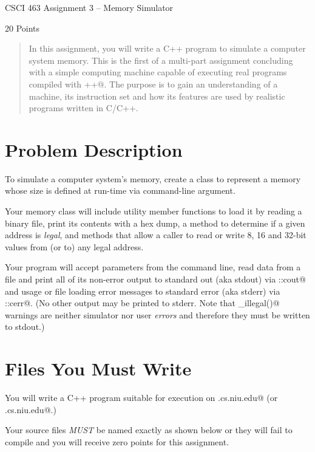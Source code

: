 \documentclass[11pt]{article}
\newcommand\MyTitle{CSCI 463 Assignment 3 -- Memory Simulator}
\begin{document}
 
\thispagestyle{plain}
\centerline{\huge\MyTitle}
\vspace{.2in}
\centerline{20 Points}

\begin{abstract}
\noindent In this assignment, you will write a C++ program to simulate 
a computer system memory.
This is the first of a multi-part assignment concluding with a simple
computing machine capable of executing real programs compiled with \verb@g++@.
The purpose is to gain an understanding of a machine, its instruction 
set and how its features are used by realistic programs written in C/C++.
\end{abstract}

\section{Problem Description}

To simulate a computer system's memory, create a class to represent a memory
whose size is defined at run-time via command-line argument.

Your memory class will include utility member functions to load it by reading 
a binary file, print its contents with a hex dump, a method to determine
if a given address is {\em legal}, and methods that allow a caller
to read or write 8, 16 and 32-bit values from (or to) any legal address.

Your program will accept parameters from the command line, read data from a 
file and print all of its non-error output to standard out (aka stdout) via 
\verb@std::cout@ and usage or file loading error messages to standard error 
(aka stderr) via \verb@std::cerr@. (No other output may be printed to stderr.
Note that \verb@check_illegal()@ warnings are neither simulator nor user {\em errors}
and therefore they must be written to stdout.)

\section{Files You Must Write}

You will write a C++ program suitable for execution on \verb@hopper.cs.niu.edu@ 
(or \verb@turing.cs.niu.edu@.)

Your source files {\em MUST} be named exactly as shown below or they will fail 
to compile and you will receive zero points for this assignment.
\end{document}
